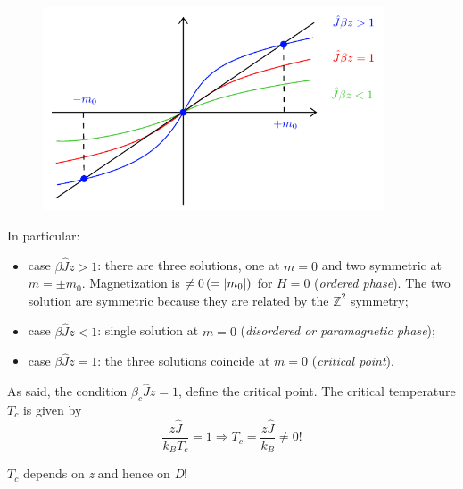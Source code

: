 \documentclass[../main/main.tex]{subfiles}
\begin{document}
\begin{figure}[h!]
\centering
\includegraphics[width=0.9\textwidth]{../lessons/11_image/1.pdf}
\caption{\label{fig:11_1}}
\end{figure}

In particular:
\begin{itemize}
\item case \( \beta \hat{J} z > 1  \): there are three solutions, one at \( m=0 \) and two symmetric at \( m=\pm m_0 \). Magnetization is \( \neq 0 \, (= \abs{m_0} )\) for \( H=0 \) (\emph{ordered phase}).  The two solution are symmetric because they are related by the \( \mathbb{Z}^2 \)  symmetry;
\item case \( \beta \hat{J} z < 1  \): single solution at \( m=0 \) (\emph{disordered or paramagnetic phase});
\item case \( \beta \hat{J} z = 1  \): the three solutions coincide at \( m=0 \) (\emph{critical point}).
\end{itemize}
As said, the condition \( \beta_c \hat{J} z = 1  \), define the critical point. The critical temperature \( T_c \) is given by
\begin{equation}
  \frac{z \hat{J} }{k_B T_c} = 1 \Rightarrow T_c = \frac{z \hat{J} }{k_B} \neq 0!
\end{equation}
\begin{remark}
\( T_c \) depends on \emph{z} and hence on \emph{D}!
\end{remark}
\end{document}
